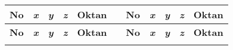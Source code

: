  \label{lam: data koord I}


\begin{longtable}[c]{rrrrlp{3.5em}rrrrl}

\cline{1-5}\cline{7-11}
\multicolumn{1}{c}{\textbf{No}} & \multicolumn{1}{c}{\textit{\textbf{x}}} & \multicolumn{1}{c}{\textit{\textbf{y}}} & \multicolumn{1}{c}{\textit{\textbf{z}}} & \multicolumn{1}{c}{\textbf{Oktan}} &       & \multicolumn{1}{c}{\textbf{No}} & \multicolumn{1}{c}{\textit{\textbf{x}}} & \multicolumn{1}{c}{\textit{\textbf{y}}} & \multicolumn{1}{c}{\textit{\textbf{z}}} & \multicolumn{1}{c}{\textbf{Oktan}}\\
\cline{1-5}\cline{7-11}
\endfirsthead

\cline{1-5}\cline{7-11}
\multicolumn{1}{c}{\textbf{No}} & \multicolumn{1}{c}{\textit{\textbf{x}}} & \multicolumn{1}{c}{\textit{\textbf{y}}} & \multicolumn{1}{c}{\textit{\textbf{z}}} & \multicolumn{1}{c}{\textbf{Oktan}} &       & \multicolumn{1}{c}{\textbf{No}} & \multicolumn{1}{c}{\textit{\textbf{x}}} & \multicolumn{1}{c}{\textit{\textbf{y}}} & \multicolumn{1}{c}{\textit{\textbf{z}}} & \multicolumn{1}{c}{\textbf{Oktan}}\\
\cline{1-5}\cline{7-11}
\endhead

\cline{1-5}\cline{7-11}
\endfoot

\cline{1-5}\cline{7-11}
\endlastfoot


\end{longtable}
